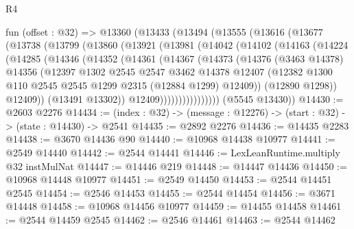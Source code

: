 \begin{lexlean}{R4}
\begin{coremodule}
  fun (offset : @32) =>
  @13360
    (@13433
      (@13494
        (@13555
          (@13616
            (@13677
              (@13738
                (@13799
                  (@13860
                    (@13921
                      (@13981
                        (@14042
                          (@14102
                            (@14163
                              (@14224
                                (@14285
                                  (@14346
                                    (@14352
                                      (@14361
                                        (@14367
                                          (@14373
                                            (@14376
                                              (@3463 @14378)
                                              @14356
                                              (@12397
                                                @1302
                                                @2545
                                                @2547
                                                @3462
                                                @14378
                                                @12407
                                                (@12382
                                                  @1300
                                                  @110
                                                  @2545
                                                  @2545
                                                  @1299
                                                  @2315
                                                  (@12884 @1299)
                                                  @12409))
                                              (@12890 @1298))
                                            @12409))
                                        (@13491 @13302))
                                      @12409))))))))))))))))
      (@5545 @13430))
@14430 := @2603 @2276
@14434 := (index : @32) -> (message : @12276) -> (start : @32) -> (state : @14430) -> @2541
@14435 := @2892 @2276
@14436 := @14435 @2283
@14438 := @3670 @14436 @90
@14440 := @10968 @14438 @10977
@14441 := @2549 @14440
@14442 := @2544 @14441
@14446 := LexLeanRuntime.multiply @32 instMulNat
@14447 := @14446 @219
@14448 := @14447 @14436
@14450 := @10968 @14448 @10977
@14451 := @2549 @14450
@14453 := @2544 @14451 @2545
@14454 := @2546 @14453
@14455 := @2544 @14454
@14456 := @3671 @14448
@14458 := @10968 @14456 @10977
@14459 := @14455 @14458
@14461 := @2544 @14459 @2545
@14462 := @2546 @14461
@14463 := @2544 @14462

\end{coremodule}
\end{lexlean}
